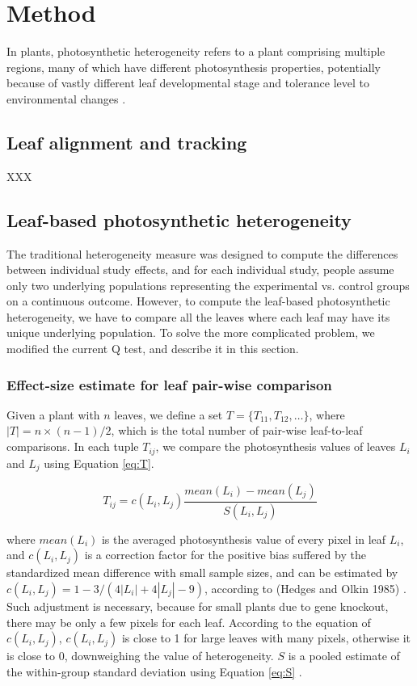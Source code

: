 \documentclass[times,11pt]{article}
\begin{document}
{\section{Method}

In plants, photosynthetic heterogeneity refers to a plant comprising multiple regions, many of which have different photosynthesis properties, potentially because of vastly different leaf developmental stage and tolerance level to environmental changes \cite{}.

\subsection{Leaf alignment and tracking}
XXX

\subsection{Leaf-based photosynthetic heterogeneity}

The traditional heterogeneity measure was designed to compute the differences between individual study effects, and for each individual study,  people assume only two underlying populations representing the
experimental vs. control groups on a continuous outcome. However, to compute the leaf-based photosynthetic heterogeneity, we have to compare all the leaves where each leaf may have its unique underlying population. To solve the more complicated problem, we modified the current Q test, and describe it in this section.

\subsubsection{Effect-size estimate for leaf pair-wise comparison}
%
Given a plant with $n$ leaves, we define a set $T = \{T_{11}, T_{12}, \ldots\}$, where $|T|=n\times(n-1)/2$, which is the total number of  pair-wise leaf-to-leaf comparisons. In each tuple $T_{ij}$, we compare the photosynthesis values of leaves $L_i$ and $L_j$ using Equation \ref{eq:T}.

\begin{equation}\label{eq:T}
T_{ij} = c(L_i, L_j) \frac{mean(L_i)-mean(L_j)}{S(L_i, L_j)}
\end{equation}

\noindent where $mean(L_i)$ is the averaged photosynthesis value of every pixel in leaf $L_i$, and $c(L_i, L_j)$ is a correction factor for the positive bias suffered by the standardized mean difference with small sample sizes, and can be estimated by $c(L_i, L_j) = 1-3/(4|L_i|+4|L_j|-9)$, according to (Hedges and Olkin 1985) \cite{hedges1998fixed}.
%
Such adjustment is necessary, because for small plants due to gene knockout, there may be only a few pixels for each leaf. According to the equation of $c(L_i, L_j)$, $c(L_i, L_j)$ is close to 1 for large leaves with many pixels, otherwise it is close to 0, downweighing the value of heterogeneity. $S$ is a pooled estimate of the within-group standard deviation using Equation \ref{eq:S} \cite{hedges1998fixed}.

}
\end{document}
